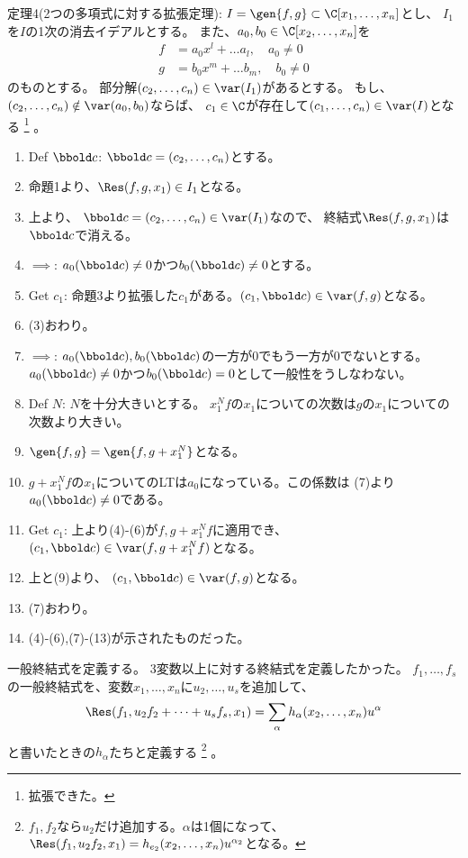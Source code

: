 定理4(2つの多項式に対する拡張定理):
$I=\gen{f,g}\subset \C[x_1,\dots,x_n]$とし、
$I_1$を$I$の1次の消去イデアルとする。
また、$a_0,b_0 \in \C[x_2,\dots,x_n]$を
\begin{align}
  f &= a_0 x^l + \dots a_l,\quad a_0 \neq 0 \\
  g &= b_0 x^m + \dots b_m, \quad b_0\neq 0
\end{align}
のものとする。
部分解$(c_2,\dots,c_n)\in \var(I_1)$があるとする。
もし、$(c_2,\dots,c_n) \notin \var(a_0,b_0)$ならば、
$c_1\in \C$が存在して$(c_1,\dots,c_n) \in \var(I)$となる
\footnote{拡張できた。}
。
\begin{myproof}
\begin{enumerate}[label=(\arabic*)]
  \item Def $\bbold c$: $\bbold c = (c_2,\dots,c_n)$とする。
  \item 命題1より、$\Res(f,g,x_1) \in I_1$となる。
  \item 上より、
  $\bbold c = (c_2,\dots,c_n) \in \var(I_1)$なので、
  終結式$\Res(f,g,x_1)$は$\bbold c$で消える。
  \item
  $\implies$: $a_0(\bbold c) \neq 0$かつ$b_0(\bbold c)\neq 0$とする。
  \item Get $c_1$:
  命題3より拡張した$c_1$がある。$(c_1,\bbold c) \in \var(f,g)$となる。
  \item (3)おわり。
  \item $\implies$: $a_0(\bbold c),b_0(\bbold c)$の一方が0でもう一方が0でないとする。$a_0(\bbold c) \neq 0$かつ$b_0(\bbold c)=0$として一般性をうしなわない。
  \item Def $N$: $N$を十分大きいとする。
  $x_1^N f$の$x_1$についての次数は$g$の$x_1$についての次数より大きい。
  \item $\gen{f,g} = \gen{f,g+x_1^N}$となる。
  \item $g+x_1^N f$の$x_1$についてのLTは$a_0$になっている。この係数は
  (7)より$a_0(\bbold c)\neq 0$である。
  \item Get $c_1$: 上より(4)-(6)が$f,g+x_1^N f$に適用でき、
  $(c_1,\bbold c) \in \var(f,g+x_1^N f)$となる。
  \item 上と(9)より、
  $(c_1,\bbold c) \in \var(f,g)$となる。
  \item (7)おわり。
  \item (4)-(6),(7)-(13)が示されたものだった。
\end{enumerate}
\end{myproof}

一般終結式を定義する。
3変数以上に対する終結式を定義したかった。
$f_1,\dots,f_s$の一般終結式を、変数$x_1,\dots,x_n$に$u_2,\dots,u_s$を追加して、
\begin{align}
  \Res(f_1, u_2f_2+\dots + u_s f_s, x_1)
  =
  \sum_\alpha h_\alpha(x_2,\dots,x_n)u^\alpha
\end{align}
と書いたときの$h_\alpha$たちと定義する
\footnote{$f_1,f_2$なら$u_2$だけ追加する。$\alpha$は1個になって、
$\Res(f_1,u_2f_2,x_1)=h_{e_2}(x_2,\dots,x_n)u^{\alpha_2}$となる。}
。

